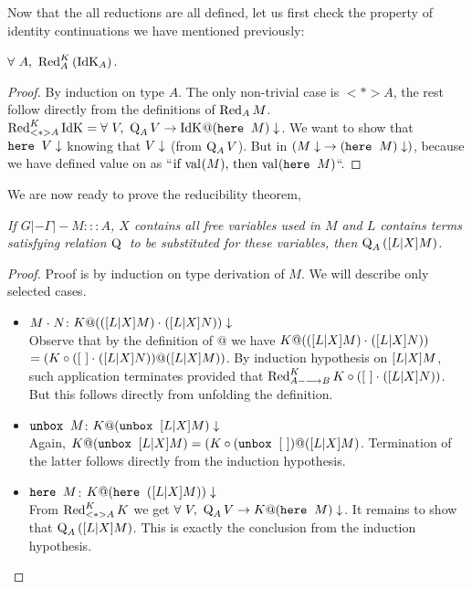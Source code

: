 Now that the all reductions are all defined, let us first check the property of identity continuations we have mentioned previously:
\begin{lemma}\label{redidk}
$\forall\ A,\ \RedK{(\IdK{A})}{A}$.
\begin{proof}
By induction on type $A$. The only non-trivial case is $<*>A$, the rest follow directly from the definitions of $\Red{M}{A}$.\\
$\RedK{\IdK{}}{<*>A} = \forall\ V,\ \Q{V}{A} -> \termin{\IdK{}@(\here{M})}$. We want to show that $\termin{\here{V}}$ knowing that $\termin{V}$ (from $\Q{V}{A}$). But in \langLF{} $(\termin{M} -> \termin{(\here{M})})$, because we have defined value on \heree{} as ``$\ifthen {\val M} {\val{\here{M}}}$``.
\end{proof}
\end{lemma}

\newpage 

We are now ready to prove the reducibility theorem,

\begin{theorem}\label{fullredtheorem}\em
If $G |- \Gamma |- M ::: A$, $X$ contains all free variables used in $M$ and $L$ contains terms satisfying relation $\Q{}{}$ to be substituted for these variables, then
$\Q{(\substt{L}{X}{M})}{A}$.
\begin{proof}
Proof is by induction on type derivation of $M$. We will describe only selected cases.
\begin{itemize}
\item $\appl{M}{N}$: $\termin{K @ (\appl{(\substt{L}{X}{M})}{(\substt{L}{X}{N})})}$ \\
Observe that by the definition of $@$ we have $K @ (\appl{(\substt{L}{X}{M})}{(\substt{L}{X}{N})})$ $= (K \circ (\appl{[~]}{(\substt{L}{X}{N})}) @ (\substt{L}{X}{M}))$. By induction hypothesis on $\substt{L}{X}{M}$, such application terminates provided that $\RedK{K \circ (\appl{[~]}{(\substt{L}{X}{N})})}{A ---> B}$. But this follows directly from unfolding the definition.

\item $\unbox{M}$: $\termin{K @ (\unbox{{\substt{L}{X}{M}}})}$\\
Again, $K @ (\unbox{{\substt{L}{X}{M}}}) = (K \circ (\unbox{[~]}) @ (\substt{L}{X}{M})$. Termination of the latter follows directly from the induction hypothesis.

\item $\here{M}$: $\termin{K @ (\here{(\substt{L}{X}{M})})}$\\
From $\RedK{K}{<*>A}$ we get $\forall\ V,\ \Q{V}{A} -> \termin{K@(\here{M})}$. It remains to show that $\Q{(\substt{L}{X}{M})}{A}$. This is exactly the conclusion from the induction hypothesis.
\end{itemize}
\end{proof}
\end{theorem}

